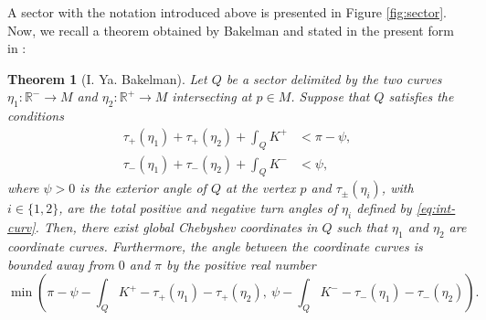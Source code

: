 \documentclass{article}
\newcommand{\R}{\mathbb{R}}
\newcommand{\surf}{M}
\newcommand{\sect}{Q}
\newtheorem{theorem}{Theorem}
\theoremstyle{remark}
\theoremstyle{prpart}
\begin{document}
A sector with the notation introduced above is presented in Figure \ref{fig:sector}. Now, we recall a theorem obtained by Bakelman \cite{Bak65} and stated in the present form in \cite{Bur05}:
\begin{theorem}[I. Ya. Bakelman]\label{thm:bak-sect}
Let $\sect$ be a sector delimited by the two curves $\eta_1:\R^-\to\surf$ and $\eta_2:\R^+\to\surf$ intersecting at $p\in\surf$. Suppose that $\sect$ satisfies the conditions
  \begin{subequations}\label{eq:cond-sector}
    \begin{alignat}{2}  \label{eq:cond-sector1}
     \tau_+(\eta_1) + \tau_+(\eta_2) + \int_\sect K^+ &< \pi-\psi,  \\
     \tau_-(\eta_1) + \tau_-(\eta_2) + \int_\sect K^- &< \psi, \label{eq:cond-sector2}
  \end{alignat}
\end{subequations}
where $\psi>0$ is the exterior angle of $\sect$ at the vertex $p$ and $\tau_\pm(\eta_i)$, with $i\in\{1,2\}$, are the total positive and negative turn angles of $\eta_i$ defined by \eqref{eq:int-curv}. Then, there exist global Chebyshev coordinates in $\sect$ such that $\eta_1$ and $\eta_2$ are coordinate curves. 
Furthermore, the angle between the coordinate curves is bounded away from $0$ and $\pi$ by the positive real number
\begin{equation*}
\min\left(\pi-\psi-\int_\sect K^+-\tau_+(\eta_1)-\tau_+(\eta_2),~ 
\psi-\int_\sect K^- - \tau_-(\eta_1)-\tau_-(\eta_2)\right).
\end{equation*}
\end{theorem}
\end{document}
